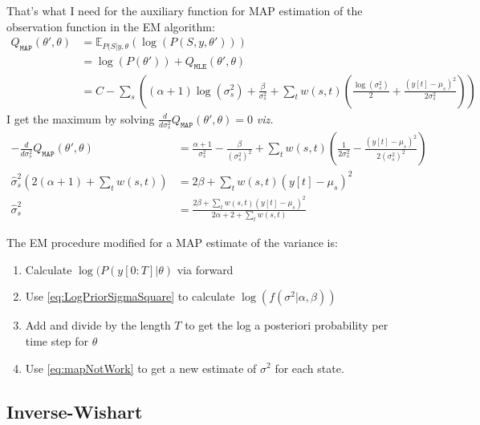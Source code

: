 \documentclass{article}
\newcommand{\parameters}{\theta}
\newcommand{\parametersPrime}{\theta'}
\newcommand{\qmle}{Q_{\mathtt{MLE}}(\parametersPrime, \parameters)}
\newcommand{\qmap}{Q_{\mathtt{MAP}}(\parametersPrime, \parameters)}
\newcommand{\field}[1]{\mathbb{#1}}
\newcommand{\EV}{\field{E}}
\begin{document}
That's what I need for the auxiliary function for MAP estimation of
the observation function in the EM algorithm:
\begin{align*}
  \qmap &= \EV_{P(S|y,\parameters} \left( \log \left (
          P\left (S,y,\parametersPrime \right) \right) \right) \\
        &=\log \left( P \left(\parametersPrime \right) \right) +  \qmle  \\
        &= C -\sum_s \left((\alpha + 1 ) \log(\sigma_s^2) +
          \frac{\beta}{\sigma_s^2} + \sum_t w(s,t)\left(
          \frac{\log(\sigma_s^2)}{2} + \frac{(y[t] - \mu_s)^2}{2
          \sigma_s^2} \right) \right)
\end{align*}
I get the maximum by solving $\frac{d}{d \sigma_s^2} \qmap = 0$
\emph{viz.}
\begin{align}
  - \frac{d}{d \sigma_s^2} \qmap &= \frac{\alpha + 1}{\sigma_s^2} -
                                   \frac{\beta}{(\sigma_s^2)^2} +
                                   \sum_t w(s,t) \left(
                                   \frac{1}{2\sigma_s^2} - \frac{(y[t]
                                   - \mu_s)^2}{2(\sigma_s^2)^2}
                                   \right) \nonumber \\
  \hat \sigma_s^2\left(2(\alpha + 1) + \sum_t w(s,t) \right)
                                 &= 2\beta + \sum_t w(s,t) (y[t] - \mu_s)^2 \nonumber \\
  \label{eq:mapNotWork}
  \hat \sigma_s^2 &= \frac{2 \beta + \sum_t w(s,t) (y[t] -
               \mu_s)^2}{2\alpha + 2 + \sum_t w(s,t)}
\end{align}

The EM procedure modified for a MAP estimate of the variance is:
\begin{enumerate}
\item Calculate $\log(P(y[0:T]|\parameters)$ via forward
\item Use \eqref{eq:LogPriorSigmaSquare} to calculate $ \log\left(
    f(\sigma^2|\alpha, \beta) \right)$
\item Add and divide by the length $T$ to get the log a posteriori
  probability per time step for $\parameters$
\item Use \eqref{eq:mapNotWork} to get a new estimate of $\sigma^2$ for
  each state.
\end{enumerate}

\subsection*{Inverse-Wishart}
\end{document}
